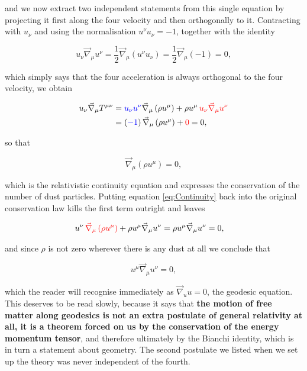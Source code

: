         and we now extract two independent statements from this single equation by projecting it first along the four velocity and then orthogonally to it. Contracting with $u_{\nu}$ and using the normalisation $u^{\nu}u_{\nu}=-1$, together with the identity

        \begin{equation}\label{eq:uOrthoAccel}
            u_{\nu}\Vec{\nabla}_{\mu}u^{\nu} = \frac{1}{2}\Vec{\nabla}_{\mu}\left(u^{\nu}u_{\nu}\right) = \frac{1}{2}\Vec{\nabla}_{\mu}\left(-1\right) = 0,
        \end{equation}

        which simply says that the four acceleration is always orthogonal to the four velocity, we obtain

        \begin{align*}
            u_{\nu}\Vec{\nabla}_{\mu}T^{\mu\nu} &= {\color{blue}u_{\nu}u^{\nu}}\Vec{\nabla}_{\mu}\left(\rho u^{\mu}\right) + \rho u^{\mu}\,{\color{red}u_{\nu}\Vec{\nabla}_{\mu}u^{\nu}}\\
            &= \left({\color{blue}-1}\right)\Vec{\nabla}_{\mu}\left(\rho u^{\mu}\right) + {\color{red}0} = 0,
        \end{align*}

        so that

        \begin{equation}\label{eq:Continuity}
            \Vec{\nabla}_{\mu}\left(\rho u^{\mu}\right)=0,
        \end{equation}

        which is the relativistic continuity equation and expresses the conservation of the number of dust particles. Putting equation \ref{eq:Continuity} back into the original conservation law kills the first term outright and leaves

        \begin{align*}
            u^{\nu}\,{\color{red}\Vec{\nabla}_{\mu}\left(\rho u^{\mu}\right)} + \rho u^{\mu}\Vec{\nabla}_{\mu}u^{\nu} &= \rho u^{\mu}\Vec{\nabla}_{\mu}u^{\nu} = 0,
        \end{align*}

        and since $\rho$ is not zero wherever there is any dust at all we conclude that

        \begin{equation}
            u^{\mu}\Vec{\nabla}_{\mu}u^{\nu} = 0,
        \end{equation}

        which the reader will recognise immediately as $\Vec{\nabla}_uu=0$, the geodesic equation. This deserves to be read slowly, because it says that \textbf{the motion of free matter along geodesics is not an extra postulate of general relativity at all, it is a theorem forced on us by the conservation of the energy momentum tensor}, and therefore ultimately by the Bianchi identity, which is in turn a statement about geometry. The second postulate we listed when we set up the theory was never independent of the fourth.

